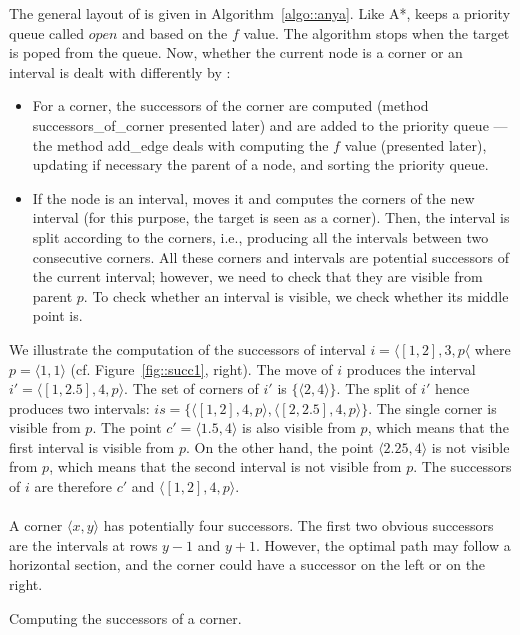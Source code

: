 The general layout of \anya{} is given in Algorithm~\ref{algo::anya}.  
Like A*, \anya{} keeps a priority queue called $open$ 
and based on the $f$ value.  
The algorithm stops when the target is poped from the queue.  
Now, whether the current node is a corner or an interval 
is dealt with differently by \anya: 
\begin{itemize}
\item 
  For a corner, the successors of the corner are computed 
  (method successors\_of\_corner presented later) 
  and are added to the priority queue --- 
  the method add\_edge deals with computing the $f$ value 
  (presented later), updating if necessary the parent of a node, 
  and sorting the priority queue.  
\item 
  If the node is an interval, \anya{} moves it 
  and computes the corners of the new interval 
  (for this purpose, the target is seen as a corner).  
  Then, the interval is split according to the corners, 
  i.e., producing all the intervals between two consecutive corners.  
  All these corners and intervals 
  are potential successors of the current interval; 
  however, we need to check that they are visible from parent $p$.  
  To check whether an interval is visible, 
  we check whether its middle point is.  
\end{itemize}

We illustrate the computation of the successors 
of interval $i = \langle [1,2],3,p\langle$ 
where $p = \langle1,1\rangle$ 
(cf. Figure~\ref{fig::succ1}, right).  
The move of $i$ produces 
the interval $i' = \langle [1,2.5],4,p\rangle$.  
The set of corners of $i'$ is $\{\langle 2,4\rangle\}$.  
The split of $i'$ hence produces two intervals: 
$is = \{
\langle [1,2],4,p\rangle,  
\langle [2,2.5],4,p\rangle
\}$.  
The single corner is visible from $p$.  
The point $c' = \langle 1.5,4\rangle$ is also visible from $p$, 
which means that the first interval is visible from $p$.  
On the other hand, the point $\langle 2.25,4\rangle$ 
is not visible from $p$, 
which means that the second interval is not visible from $p$.  
The successors of $i$ are therefore $c'$ 
and $\langle [1,2],4,p\rangle$.  

\paragraph*{}

A corner $\langle x,y\rangle$ has potentially four successors.  
The first two obvious successors 
are the intervals at rows $y-1$ and $y+1$.  
However, the optimal path may follow a horizontal section, 
and the corner could have a successor on the left or on the right.  

\begin{algorithm}
  
  \caption{Computing the successors of a corner.}
  \label{algo::successorsofacorner}
\end{algorithm}

